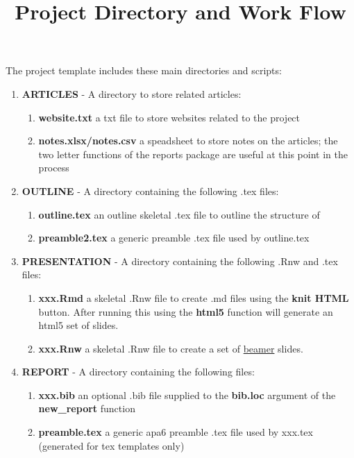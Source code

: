 \documentclass{article}\usepackage{graphicx, color}
\begin{document}
\title{Project Directory and Work Flow}
\author{}
\date{}
\maketitle

The project template includes these main directories and scripts:

\begin{enumerate}
  \item \textbf{ARTICLES} - A directory to store related articles:
  \begin{enumerate}
    \item \textbf{website.txt} a txt file to store websites related to the project
    \item \textbf{notes.xlsx/notes.csv} a speadsheet to store notes on the articles; the two letter functions of the reports package are useful at this point in the process
  \end{enumerate}
  \item \textbf{OUTLINE} - A directory containing the following .tex files:
  \begin{enumerate}
    \item \textbf{outline.tex} an outline skeletal .tex file to outline the structure of  
    \item \textbf{preamble2.tex} a generic preamble .tex file used by outline.tex  
  \end{enumerate}  
  \item \textbf{PRESENTATION} - A directory containing the following .Rnw and .tex files:
  \begin{enumerate}
    \item \textbf{xxx.Rmd} a skeletal .Rnw file to create .md files using the \textbf{knit HTML} button.  After running this using the \textbf{html5} function will generate an html5 set of slides.
    \item \textbf{xxx.Rnw} a skeletal .Rnw file to create a set of \href{http://www.math.umbc.edu/~rouben/beamer/}{beamer} slides.   
  \end{enumerate} 
  \item \textbf{REPORT} - A directory containing the following files:
  \begin{enumerate}
    \item \textbf{xxx.bib} an optional .bib file supplied to the \textbf{bib.loc} argument of the \textbf{new\_report} function
    \item \textbf{preamble.tex} a generic apa6 preamble .tex file used by xxx.tex (generated for tex templates only) 

\end{enumerate}
\end{enumerate}
\end{document}
